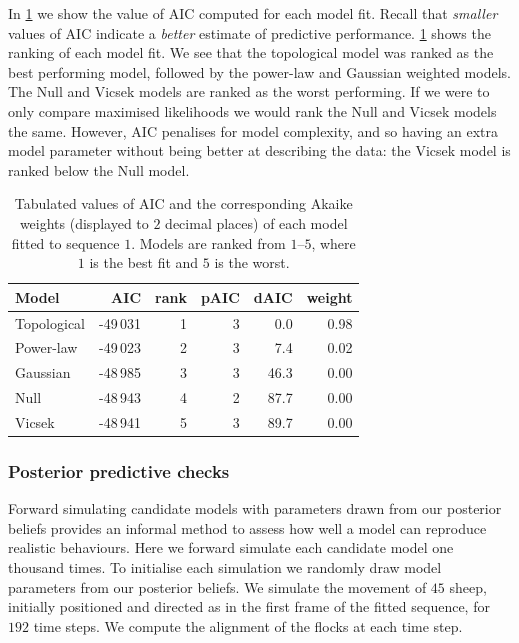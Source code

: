 In \cref{tab:aic_seq1} we show the value of AIC computed for each model fit.
Recall that \emph{smaller} values of AIC indicate a \emph{better} estimate of
predictive performance. \cref{tab:aic_seq1} shows the ranking of each model
fit. We see that the topological model was ranked as the best performing model,
followed by the power-law and Gaussian weighted models. The Null and Vicsek
models are ranked as the worst performing. If we were to only compare maximised
likelihoods we would rank the Null and Vicsek models the same. However, AIC
penalises for model complexity, and so having an extra model parameter without
being better at describing the data: the Vicsek model is ranked below the Null
model.

\begin{table}[tbp]
\begin{tabular}{@{}lrrrrr@{}}
\toprule
Model                       &      AIC & rank & pAIC & dAIC & weight \\
\midrule
Topological                 & -49\,031 &    1 &  3 &  0.0 &   0.98 \\
Power-law                   & -49\,023 &    2 &  3 &  7.4 &   0.02 \\
Gaussian                    & -48\,985 &    3 &  3 & 46.3 &   0.00 \\
Null                        & -48\,943 &    4 &  2 & 87.7 &   0.00 \\
Vicsek                      & -48\,941 &    5 &  3 & 89.7 &   0.00 \\
\bottomrule
\end{tabular}
\caption{Tabulated values of AIC and the corresponding Akaike weights
  (displayed to $2$ decimal places) of each model fitted to sequence $1$. Models
  are ranked from $1$--$5$, where $1$ is the best fit and $5$ is the worst.}
\label{tab:aic_seq1}
\end{table}

\subsubsection{Posterior predictive checks}

Forward simulating candidate models with parameters drawn from our posterior
beliefs provides an informal method to assess how well a model can reproduce
realistic behaviours. Here we forward simulate each candidate model one
thousand times. To initialise each simulation we randomly draw model parameters
from our posterior beliefs. We simulate the movement of $45$ sheep, initially
positioned and directed as in the first frame of the fitted sequence, for $192$
time steps. We compute the alignment of the flocks at each time step.


